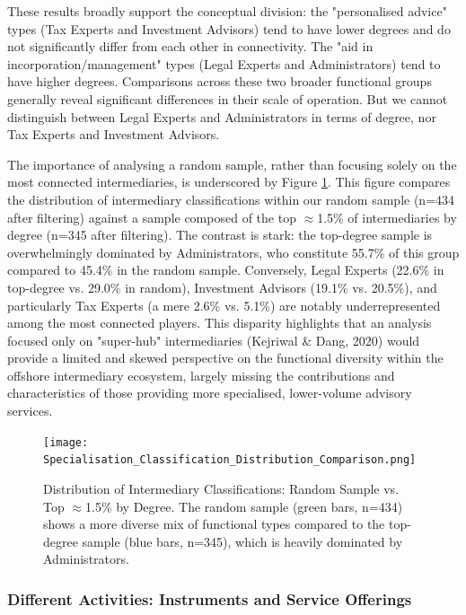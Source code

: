 These results broadly support the conceptual division: the "personalised advice" types (Tax Experts and Investment Advisors) tend to have lower degrees and do not significantly differ from each other in connectivity. The "aid in incorporation/management" types (Legal Experts and Administrators) tend to have higher degrees. Comparisons across these two broader functional groups generally reveal significant differences in their scale of operation. But we cannot distinguish between Legal Experts and Administrators in terms of degree, nor Tax Experts and Investment Advisors.

The importance of analysing a random sample, rather than focusing solely on the most connected intermediaries, is underscored by Figure \ref{fig:specialisation_classification_distribution}. This figure compares the distribution of intermediary classifications within our random sample (n=434 after filtering) against a sample composed of the top $\approx$1.5\% of intermediaries by degree (n=345 after filtering). The contrast is stark: the top-degree sample is overwhelmingly dominated by Administrators, who constitute 55.7\% of this group compared to 45.4\% in the random sample. Conversely, Legal Experts (22.6\% in top-degree vs. 29.0\% in random), Investment Advisors (19.1\% vs. 20.5\%), and particularly Tax Experts (a mere 2.6\% vs. 5.1\%) are notably underrepresented among the most connected players. This disparity highlights that an analysis focused only on "super-hub" intermediaries (Kejriwal \& Dang, 2020) would provide a limited and skewed perspective on the functional diversity within the offshore intermediary ecosystem, largely missing the contributions and characteristics of those providing more specialised, lower-volume advisory services. 

\begin{figure}[htbp]
    \centering
    \texttt{[image: Specialisation\_Classification\_Distribution\_Comparison.png]}
    \caption{Distribution of Intermediary Classifications: Random Sample vs. Top $\approx$1.5\% by Degree. The random sample (green bars, n=434) shows a more diverse mix of functional types compared to the top-degree sample (blue bars, n=345), which is heavily dominated by Administrators.}
    \label{fig:specialisation_classification_distribution}
\end{figure}

\subsubsection{Different Activities: Instruments and Service Offerings}
\label{subsubsec:activities_functional}

